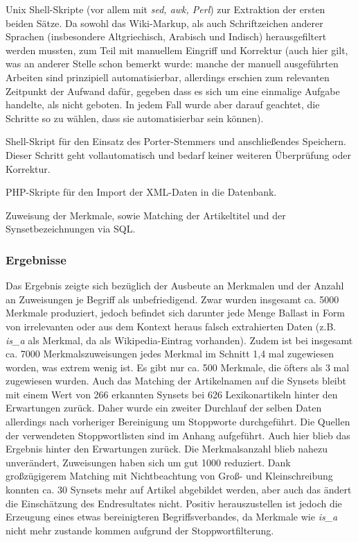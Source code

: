 \documentclass[pagesize,DIV=calc,12pt,draft]{scrreprt}
\begin{document}
\begin{inparaenum}
\item Unix Shell-Skripte (vor allem mit \emph{sed, awk, Perl}) zur Extraktion der ersten beiden Sätze. 
Da sowohl das Wiki-Markup, als auch Schriftzeichen anderer Sprachen (insbesondere Altgriechisch, Arabisch und Indisch) herausgefiltert werden mussten, zum Teil mit manuellem Eingriff und Korrektur (auch hier gilt, was an anderer Stelle schon bemerkt wurde: manche der manuell ausgeführten Arbeiten sind prinzipiell automatisierbar, allerdings erschien zum relevanten Zeitpunkt der Aufwand dafür, gegeben dass es sich um eine einmalige Aufgabe handelte, als nicht geboten. 
In jedem Fall wurde aber darauf geachtet, die Schritte so zu wählen, dass sie automatisierbar sein können). 

\item Shell-Skript für den Einsatz des Porter-Stemmers und anschließendes Speichern. 
Dieser Schritt geht vollautomatisch und bedarf keiner weiteren Überprüfung oder Korrektur. 
\item PHP-Skripte für den Import der XML-Daten in die Datenbank.

\item Zuweisung der Merkmale, sowie Matching der Artikeltitel und der Synsetbezeichnungen via SQL. 
\end{inparaenum}

\subsubsection{Ergebnisse}

Das Ergebnis zeigte sich bezüglich der Ausbeute an Merkmalen und der Anzahl an Zuweisungen je Begriff als unbefriedigend. 
Zwar wurden insgesamt ca. 5000 Merkmale produziert, jedoch befindet sich darunter jede Menge Ballast in Form von irrelevanten oder aus dem Kontext heraus falsch extrahierten Daten (z.B. \emph{is\_a} als Merkmal, da als Wikipedia-Eintrag vorhanden). 
Zudem ist bei insgesamt ca. 7000 Merkmalszuweisungen jedes Merkmal im Schnitt 1,4 mal zugewiesen worden, was extrem wenig ist. 
Es gibt nur ca. 500 Merkmale, die öfters als 3 mal zugewiesen wurden. 
Auch das Matching der Artikelnamen auf die Synsets bleibt mit einem Wert von 266 erkannten Synsets bei 626 Lexikonartikeln hinter den Erwartungen zurück. 
Daher wurde ein zweiter Durchlauf der selben Daten allerdings nach vorheriger Bereinigung um Stoppworte durchgeführt. 
Die Quellen der verwendeten Stoppwortlisten sind im Anhang aufgeführt. 
Auch hier blieb das Ergebnis hinter den Erwartungen zurück. 
Die Merkmalsanzahl blieb nahezu unverändert, Zuweisungen haben sich um gut 1000 reduziert. 
Dank großzügigerem Matching mit Nichtbeachtung von Groß- und Kleinschreibung konnten ca. 30 Synsets mehr auf Artikel abgebildet werden, aber auch das ändert die Einschätzung des Endresultates nicht. 
Positiv herauszustellen ist jedoch die Erzeugung eines etwas bereinigteren Begriffsverbandes, da Merkmale wie \emph{is\_a} nicht mehr zustande kommen aufgrund der Stoppwortfilterung. 
\end{document}
